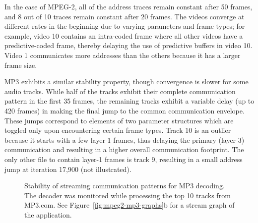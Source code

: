 In the case of MPEG-2, all of the address traces remain constant after
50 frames, and 8 out of 10 traces remain constant after 20 frames.
The videos converge at different rates in the beginning due to varying
parameters and frame types; for example, video 10 contains an
intra-coded frame where all other videos have a predictive-coded
frame, thereby delaying the use of predictive buffers in video 10.
Video 1 communicates more addresses than the others because it has a
larger frame size.

MP3 exhibits a similar stability property, though convergence is
slower for some audio tracks.  While half of the tracks exhibit their
complete communication pattern in the first 35 frames, the remaining
tracks exhibit a variable delay (up to 420 frames) in making the final
jump to the common communication envelope.  These jumps correspond to
elements of two parameter structures
which are toggled only upon encountering certain frame types.  Track
10 is an outlier because it starts with a few layer-1 frames, thus
delaying the primary (layer-3) communication and resulting in a higher
overall communication footprint.  The only other file to contain
layer-1 frames is track 9, resulting in a small address jump at
iteration 17,900 (not illustrated).

\begin{figure}[t]
\begin{minipage}{3.075in}
\hspace{-0.05in}
\vspace{-12pt}
\caption[Stability of streaming communication patterns for MPEG-2
  decoding]{Stability of streaming communication patterns for MPEG-2
  decoding.  The decoder was monitored while processing the top 10
  short videos
from YouTube.  See Figure~\ref{fig:mpeg2-mp3-graphs}a for a stream
graph of the application.\protect\label{fig:mpeg2-addresses}}
\end{minipage}
\hspace{0.3in}
\begin{minipage}{3.02in}
\hspace{-0.05in}
\vspace{-12pt}
\caption[Stability of streaming communication patterns for MP3
  decoding]{Stability of streaming communication patterns for MP3
  decoding.  The decoder was monitored while processing the top 10
  tracks from MP3.com.  See Figure~\ref{fig:mpeg2-mp3-graphs}b for a
  stream graph of the application.  \protect\label{fig:mp3-addresses}}
\end{minipage}
\end{figure}

